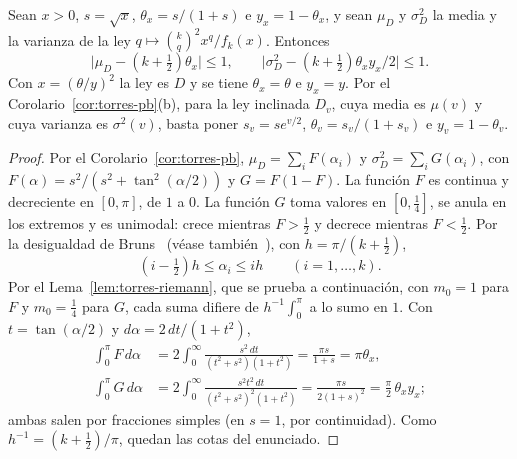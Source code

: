 \begin{lema}\label{lem:torres-momentos}
Sean $x>0$, $s=\sqrt x$, $\theta_x=s/(1+s)$ e $y_x=1-\theta_x$, y sean $\mu_D$ y $\sigma_D^2$ la media y la
varianza de la ley $q\mapsto\binom kq^2x^q/f_k(x)$. Entonces
\[
 \bigl|\mu_D-(k+\tfrac12)\theta_x\bigr|\le1,\qquad \bigl|\sigma_D^2-(k+\tfrac12)\theta_xy_x/2\bigr|\le1.
\]
Con $x=(\theta/y)^2$ la ley es $D$ y se tiene $\theta_x=\theta$ e $y_x=y$. Por el
Corolario~\ref{cor:torres-pb}(b), para la ley inclinada $D_v$, cuya media es $\mu(v)$ y cuya varianza es
$\sigma^2(v)$, basta poner $s_v=se^{v/2}$, $\theta_v=s_v/(1+s_v)$ e $y_v=1-\theta_v$.
\end{lema}
\begin{proof}
Por el Corolario~\ref{cor:torres-pb}, $\mu_D=\sum_iF(\alpha_i)$ y $\sigma_D^2=\sum_iG(\alpha_i)$, con
$F(\alpha)=s^2/(s^2+\tan^2(\alpha/2))$ y $G=F(1-F)$. La función $F$ es continua y decreciente en
$[0,\pi]$, de $1$ a $0$. La función $G$ toma valores en $[0,\frac14]$, se anula en los extremos y es
unimodal: crece mientras $F>\frac12$ y decrece mientras $F<\frac12$. Por la desigualdad de
Bruns~\cite{Bruns} (véase también~\cite[\S6.21]{Szego}), con $h=\pi/(k+\frac12)$,
\[
 (i-\tfrac12)h\le\alpha_i\le ih\qquad(i=1,\dots,k).
\]
Por el Lema~\ref{lem:torres-riemann}, que se prueba a continuación, con $m_0=1$ para $F$ y
$m_0=\frac14$ para $G$, cada suma difiere de $h^{-1}\int_0^\pi$ a lo sumo en $1$. Con $t=\tan(\alpha/2)$ y
$d\alpha=2\,dt/(1+t^2)$,
\[
\begin{aligned}
 \int_0^\pi F\,d\alpha&=2\int_0^\infty\frac{s^2\,dt}{(t^2+s^2)(1+t^2)}=\frac{\pi s}{1+s}=\pi\theta_x,\\
 \int_0^\pi G\,d\alpha&=2\int_0^\infty\frac{s^2t^2\,dt}{(t^2+s^2)^2(1+t^2)}=\frac{\pi s}{2(1+s)^2}
 =\frac\pi2\,\theta_xy_x;
\end{aligned}
\]
ambas salen por fracciones simples (en $s=1$, por continuidad). Como $h^{-1}=(k+\frac12)/\pi$, quedan
las cotas del enunciado.
\end{proof}

